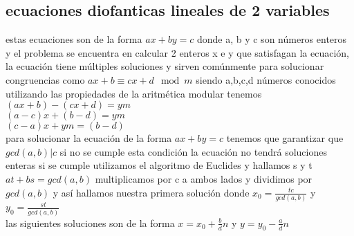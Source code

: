 \subsection{ecuaciones diofanticas lineales de 2 variables }
estas ecuaciones son de la forma $ax+by=c$ donde a, b y c son números enteros y el problema se encuentra en calcular
2 enteros x e y que satisfagan la ecuación, la ecuación tiene múltiples soluciones y sirven comúnmente para solucionar congruencias como $ax+b\equiv cx+d \mod{m}$ siendo a,b,c,d números conocidos utilizando las propiedades de la aritmética modular tenemos\\
$(ax+b)-(cx+d)=ym$\\
$(a-c)x+(b-d)=ym$\\
$(c-a)x+ym=(b-d)$\\
para solucionar la ecuación de la forma $ax+by=c$  tenemos que garantizar que $gcd(a,b)|c$
si no se cumple esta condición la ecuación no tendrá soluciones enteras
si  se cumple utilizamos el algoritmo de Euclides  y hallamos s y t $at+bs=gcd(a,b)$
multiplicamos por c a ambos lados y dividimos por $gcd(a,b)$ y así hallamos nuestra primera solución
donde $x_{0}=\frac{tc}{gcd(a,b)}$ y $y_{0}=\frac{st}{gcd(a,b)}$ \\
las siguientes soluciones son de la forma $x = x_{0} + \frac{b}{d}n$ y $y = y_{0} - \frac{a}{d}n$
